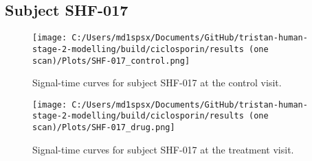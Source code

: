 \documentclass{epflreport}%
\begin{document}
\subsection{Subject SHF{-}017}%
\label{subsec:SubjectSHF{-}017}%

%


\begin{figure}[h!]%
\centering%
\texttt{[image: C:/Users/md1spsx/Documents/GitHub/tristan-human-stage-2-modelling/build/ciclosporin/results (one scan)/Plots/SHF-017\_control.png]}%
\caption{Signal{-}time curves for subject SHF{-}017 at the control visit.}%
\end{figure}

%


\begin{figure}[h!]%
\centering%
\texttt{[image: C:/Users/md1spsx/Documents/GitHub/tristan-human-stage-2-modelling/build/ciclosporin/results (one scan)/Plots/SHF-017\_drug.png]}%
\caption{Signal{-}time curves for subject SHF{-}017 at the treatment visit.}%
\end{figure}
\end{document}

